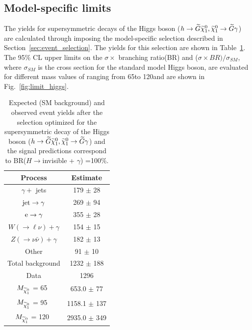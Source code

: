 \subsection{Model-specific limits}

   The yields for supersymmetric decays of the Higgs boson ($h\to \widetilde{G}\widetilde{\chi}^{0}_{1},\widetilde{\chi}^{0}_{1}\to\widetilde{G}\gamma$) are calculated through imposing the model-specific selection described in Section~\ref{sec:event_selection}. The yields for this selection are shown in Table~\ref{tab:exoh}. The 95$\%$ CL upper limits on the $\sigma \times$ branching ratio(BR) and ($\sigma \times BR )/ \sigma_{SM}$, where $\sigma_{SM}$ is the cross section for the standard model Higgs boson, are evaluated for different mass values of \PSGczDo ranging from 65\GeV to 120\GeV and are shown in Fig.~\ref{fig:limit_higgs}.   
                       
\begin{table}[H]
\centering
\begin{tabular}{|c|c|}
\hline
Process 						& 			Estimate \\ \hline
$\gamma +$ jets                         	& 			179 $\pm$ 28 \\
${\rm jet}\rightarrow \gamma$		& 			269 $\pm$ 94 \\
${\rm e} \rightarrow \gamma$		&			355 $\pm$ 28 \\
$W(\to \ell\nu)+\gamma $			&			154 $\pm$ 15 \\
$Z( \to \nu \bar{\nu} )+\gamma$  	&  			182 $\pm$ 13 \\
Other                                    		&  			91 $\pm$  10 \\ \hline
Total background                       		&   			1232 $\pm$ 188 \\ \hline
Data                                   		&  			1296  \\ \hline \hline
$M_{\widetilde{\chi}^{0}_{1}}$ = 65~\GeV 		& 			653.0 $\pm$ 77 \\
$M_{\widetilde{\chi}^{0}_{1}}$ = 95~\GeV 		& 			1158.1  $\pm$ 137\\
$M_{\widetilde{\chi}^{0}_{1}}$ = 120~\GeV 		& 			2935.0 $\pm$ 349 \\ \hline
\end{tabular}

\caption{Expected (SM background) and observed event yields after the selection optimized for the supersymmetric decay of the Higgs boson ($h\to\widetilde{G}\widetilde{\chi}^{0}_{1},\widetilde{\chi}^{0}_{1}\to\widetilde{G}\gamma$) and the signal predictions  correspond to BR($H \rightarrow $invisible + $\gamma$) =100\%.}

\label{tab:exoh}

\end{table}


